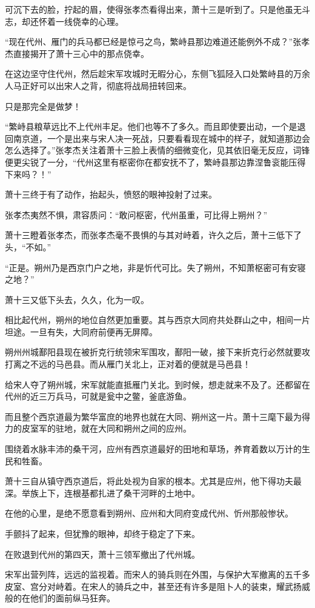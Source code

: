 可沉下去的脸，拧起的眉，使得张孝杰看得出来，萧十三是听到了。只是他虽无斗志，却还怀着一线侥幸的心理。

“现在代州、雁门的兵马都已经是惊弓之鸟，繁峙县那边难道还能例外不成？”张孝杰直接揭开了萧十三心中的那点侥幸。

在这边坚守住代州，然后趁宋军攻城时无暇分心，东侧飞狐陉入口处繁峙县的万余人马正好可以出宋人之背，彻底将战局扭转回来。

只是那完全是做梦！

“繁峙县粮草远比不上代州丰足。他们也等不了多久。而且即使要出动，一个是退回南京道，一个是出来与宋人决一死战，只要看看现在城中的样子，就知道那边会怎么选择了。”张孝杰关注着萧十三脸上表情的细微变化，见其依旧毫无反应，词锋便更尖锐了一分，“代州这里有枢密你在都安抚不了，繁峙县那边靠涅鲁衮能压得下来吗？！”

萧十三终于有了动作，抬起头，愤怒的眼神投射了过来。

张孝杰夷然不惧，肃容质问：“敢问枢密，代州虽重，可比得上朔州？”

萧十三瞪着张孝杰，而张孝杰毫不畏惧的与其对峙着，许久之后，萧十三低下了头，“不如。”

“正是。朔州乃是西京门户之地，非是忻代可比。失了朔州，不知萧枢密可有安寝之地？”

萧十三又低下头去，久久，化为一叹。

相比起代州，朔州的地位自然更加重要。其与西京大同府共处群山之中，相间一片坦途。一旦有失，大同府前便再无屏障。

朔州州城鄯阳县现在被折克行统领宋军围攻，鄯阳一破，接下来折克行必然就要攻打离之不远的马邑县。而从雁门关北上，正对着的便就是马邑县！

给宋人夺了朔州城，宋军就能直抵雁门关北。到时候，想走就来不及了。还都留在代州的近三万兵马，可就是瓮中之鳖，釜底游鱼。

而且整个西京道最为繁华富庶的地界也就在大同、朔州这一片。萧十三麾下最为得力的皮室军的驻地，就在大同和朔州之间的应州。

围绕着水脉丰沛的桑干河，应州有西京道最好的田地和草场，养育着数以万计的生民和牲畜。

萧十三自从镇守西京道后，将此处视为自家的根本。尤其是应州，他下得功夫最深。举族上下，连根基都扎进了桑干河畔的土地中。

在他的心里，是绝不愿意看到朔州、应州和大同府变成代州、忻州那般惨状。

手颤抖了起来，但犹豫的眼神，却终于稳定了下来。

在败退到代州的第四天，萧十三领军撤出了代州城。

宋军出营列阵，远远的监视着。而宋人的骑兵则在外围，与保护大军撤离的五千多皮室、宫分对峙着。在宋人的骑兵之中，甚至还有许多是阻卜人的装束，耀武扬威般的在他们的面前纵马狂奔。

